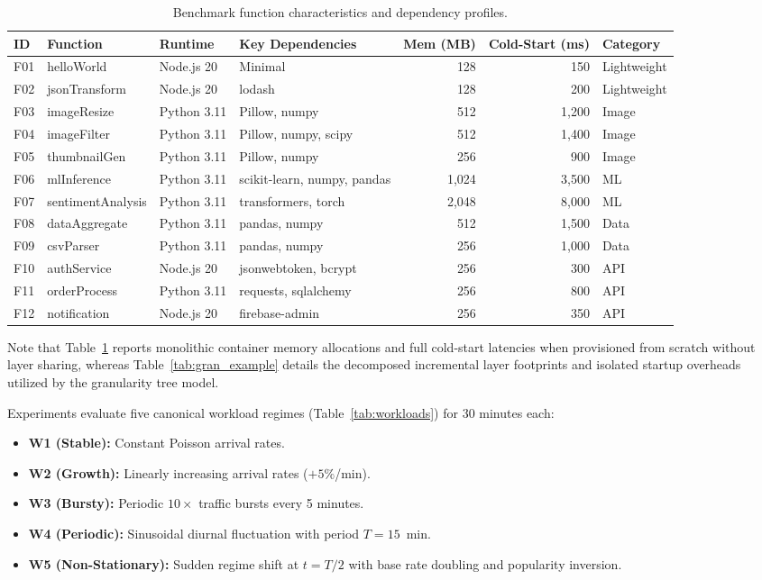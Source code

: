 \documentclass[final,5p,times,twocolumn]{elsarticle}
\begin{document}
\begin{table}[htbp]
\centering
\caption{Benchmark function characteristics and dependency profiles.}
\label{tab:benchmark_functions}
\begin{tabular}{llllrrl}
\toprule
ID & Function & Runtime & Key Dependencies & Mem (MB) & Cold-Start (ms) & Category \\
\midrule
F01 & helloWorld & Node.js 20 & Minimal & 128 & 150 & Lightweight \\
F02 & jsonTransform & Node.js 20 & lodash & 128 & 200 & Lightweight \\
F03 & imageResize & Python 3.11 & Pillow, numpy & 512 & 1,200 & Image \\
F04 & imageFilter & Python 3.11 & Pillow, numpy, scipy & 512 & 1,400 & Image \\
F05 & thumbnailGen & Python 3.11 & Pillow, numpy & 256 & 900 & Image \\
F06 & mlInference & Python 3.11 & scikit-learn, numpy, pandas & 1,024 & 3,500 & ML \\
F07 & sentimentAnalysis & Python 3.11 & transformers, torch & 2,048 & 8,000 & ML \\
F08 & dataAggregate & Python 3.11 & pandas, numpy & 512 & 1,500 & Data \\
F09 & csvParser & Python 3.11 & pandas, numpy & 256 & 1,000 & Data \\
F10 & authService & Node.js 20 & jsonwebtoken, bcrypt & 256 & 300 & API \\
F11 & orderProcess & Python 3.11 & requests, sqlalchemy & 256 & 800 & API \\
F12 & notification & Node.js 20 & firebase-admin & 256 & 350 & API \\
\bottomrule
\end{tabular}
\end{table}

Note that Table~\ref{tab:benchmark_functions} reports monolithic container memory allocations and full cold-start latencies when provisioned from scratch without layer sharing, whereas Table~\ref{tab:gran_example} details the decomposed incremental layer footprints and isolated startup overheads utilized by the granularity tree model.

Experiments evaluate five canonical workload regimes (Table~\ref{tab:workloads}) for 30 minutes each:
\begin{itemize}[leftmargin=*]
    \item \textbf{W1 (Stable):} Constant Poisson arrival rates.
    \item \textbf{W2 (Growth):} Linearly increasing arrival rates ($+5\%$/min).
    \item \textbf{W3 (Bursty):} Periodic $10\times$ traffic bursts every 5 minutes.
    \item \textbf{W4 (Periodic):} Sinusoidal diurnal fluctuation with period $T=15$~min.
    \item \textbf{W5 (Non-Stationary):} Sudden regime shift at $t=T/2$ with base rate doubling and popularity inversion.
\end{itemize}
\end{document}
